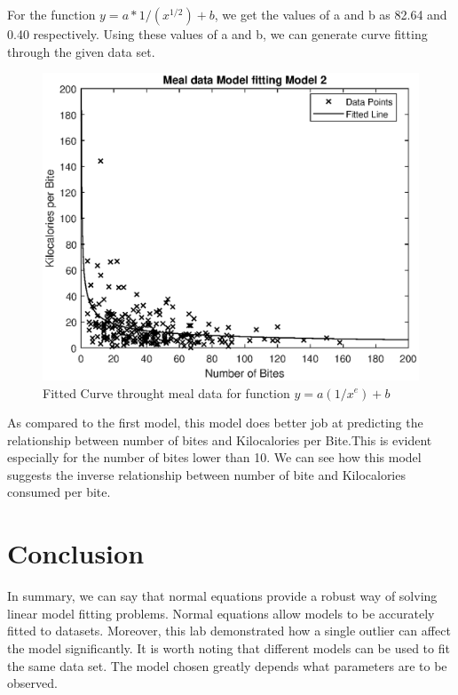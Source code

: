 \documentclass{article}
\begin{document}
\par
For the function $y=a*1/(x^{1/2}) + b$, we get the values of a and b as 82.64 and 0.40 respectively. Using these values of a and b, we can generate curve fitting through the given data set.\\
\begin{figure}[!htb]
\centering
\includegraphics[scale=0.75]{fourth_result.eps}
\caption{Fitted Curve throught meal data for function $y=a(1/x^{e})+ b$ }
\label{fig:fourth_res}
\end{figure}

As compared to the first model, this model does better job at predicting the relationship between number of bites and Kilocalories per Bite.This is evident especially for the number of bites lower than 10. We can see how this model suggests the inverse relationship between number of bite and Kilocalories consumed per bite.



\afterpage{

}
\clearpage

\section{\centering Conclusion}\label{sec:conc}
In summary, we can say that normal equations provide a robust way of solving linear model fitting problems. Normal equations allow models to be accurately fitted to datasets. Moreover, this lab demonstrated how a single outlier can affect the model significantly. It is worth noting that different models can be used to fit the same data set. The model chosen greatly depends what parameters are to be observed.
\end{document}
